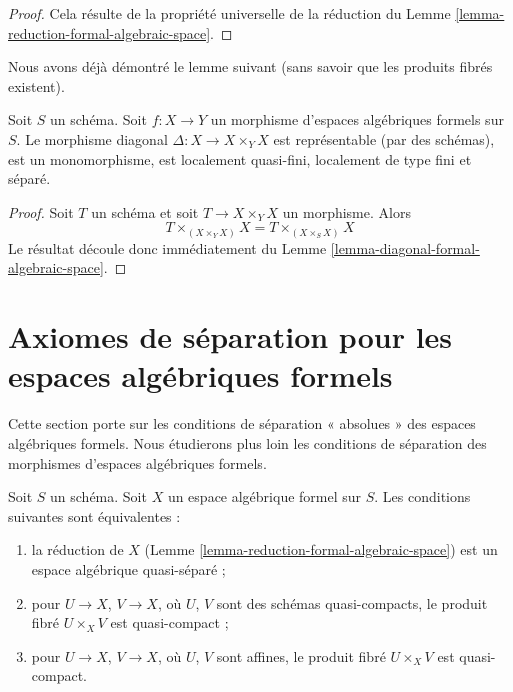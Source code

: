 \begin{proof}
Cela résulte de la propriété universelle de la réduction
du Lemme \ref{lemma-reduction-formal-algebraic-space}.
\end{proof}

\noindent
Nous avons déjà démontré le lemme suivant (sans savoir que
les produits fibrés existent).

\begin{lemma}
\label{lemma-diagonal-morphism-formal-algebraic-spaces}
Soit $S$ un schéma. Soit $f : X \to Y$ un morphisme d'espaces algébriques formels
sur $S$. Le morphisme diagonal $\Delta : X \to X \times_Y X$
est représentable (par des schémas), est un monomorphisme, est localement quasi-fini,
localement de type fini et séparé.
\end{lemma}

\begin{proof}
Soit $T$ un schéma et soit $T \to X \times_Y X$ un morphisme.
Alors
$$
T \times_{(X \times_Y X)} X = T \times_{(X \times_S X)} X
$$
Le résultat découle donc immédiatement du
Lemme \ref{lemma-diagonal-formal-algebraic-space}.
\end{proof}






\section{Axiomes de séparation pour les espaces algébriques formels}
\label{section-separation}

\noindent
Cette section porte sur les conditions de séparation « absolues » des espaces
algébriques formels. Nous étudierons plus loin les conditions de séparation
des morphismes d'espaces algébriques formels.

\begin{lemma}
\label{lemma-characterize-quasi-separated}
Soit $S$ un schéma. Soit $X$ un espace algébrique formel sur $S$.
Les conditions suivantes sont équivalentes :
\begin{enumerate}
\item la réduction de $X$
(Lemme \ref{lemma-reduction-formal-algebraic-space}) est un
espace algébrique quasi-séparé ;
\item pour $U \to X$, $V \to X$, où $U$, $V$ sont des schémas quasi-compacts,
le produit fibré $U \times_X V$ est quasi-compact ;
\item pour $U \to X$, $V \to X$, où $U$, $V$ sont affines,
le produit fibré $U \times_X V$ est quasi-compact.
\end{enumerate}
\end{lemma}

